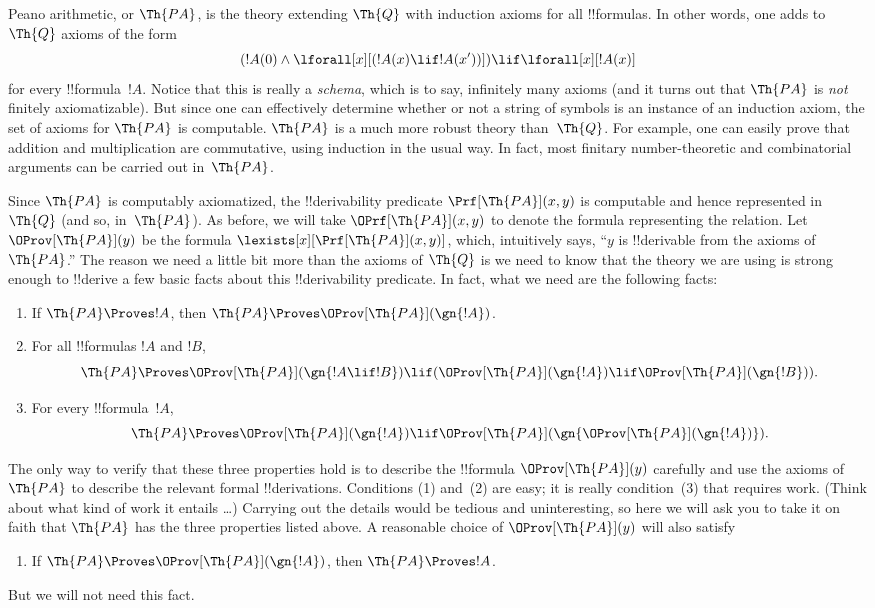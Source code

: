 \documentclass[../../../include/open-logic-section]{subfiles}
\begin{document}


Peano arithmetic, or $\Th{PA}$, is the theory extending $\Th{Q}$ with
induction axioms for all !!{formula}s. In other words, one adds to $\Th{Q}$
axioms of the form
\[
(!A(0) \land \lforall[x][(!A(x) \lif !A(x'))]) \lif \lforall[x][!A(x)]
\]
for every !!{formula}~$!A$. Notice that this is really a
\emph{schema}, which is to say, infinitely many axioms (and it turns
out that $\Th{PA}$ is {\em not} finitely axiomatizable). But since one
can effectively determine whether or not a string of symbols is an
instance of an induction axiom, the set of axioms for $\Th{PA}$ is
computable. $\Th{PA}$ is a much more robust theory than~$\Th{Q}$. For
example, one can easily prove that addition and multiplication are
commutative, using induction in the usual way. In fact, most finitary
number-theoretic and combinatorial arguments can be carried out
in~$\Th{PA}$.

Since $\Th{PA}$ is computably axiomatized, the !!{derivability}
predicate $\Prf[\Th{PA}](x,y)$ is computable and hence represented
in~$\Th{Q}$ (and so, in~$\Th{PA}$). As before, we will take
$\OPrf[\Th{PA}](x,y)$ to denote the formula representing the relation.
Let $\OProv[\Th{PA}](y)$ be the formula
$\lexists[x][\Prf[\Th{PA}](x,y)]$, which, intuitively says, ``$y$ is
!!{derivable} from the axioms of $\Th{PA}$.''  The reason we need a
little bit more than the axioms of $\Th{Q}$ is we need to know that
the theory we are using is strong enough to !!{derive} a few basic
facts about this !!{derivability} predicate. In fact, what we need are
the following facts:
\begin{enumerate}
\item[P1.] If $\Th{PA} \Proves !A$, then $\Th{PA} \Proves
  \OProv[\Th{PA}](\gn{!A})$.
\item[P2.] For all !!{formula}s $!A$ and $!B$,
  \[
  \Th{PA} \Proves \OProv[\Th{PA}](\gn{!A \lif !B}) \lif
  (\OProv[\Th{PA}](\gn{!A}) \lif \OProv[\Th{PA}](\gn{!B})).
  \]
\item[P3.] For every !!{formula}~$!A$,
  \[
  \Th{PA} \Proves \OProv[\Th{PA}](\gn{!A})
  \lif \OProv[\Th{PA}](\gn{\OProv[\Th{PA}](\gn{!A})}).
  \]
\end{enumerate}
The only way to verify that these three properties hold is to describe
the !!{formula} $\OProv[\Th{PA}](y)$ carefully and use the axioms of
$\Th{PA}$ to describe the relevant formal !!{derivation}s. Conditions (1)
and~(2) are easy; it is really condition~(3) that requires
work. (Think about what kind of work it entails \dots) Carrying out the
details would be tedious and uninteresting, so here we will ask you to
take it on faith that $\Th{PA}$ has the three properties listed
above. A reasonable choice of $\OProv[\Th{PA}](y)$ will also satisfy
\begin{enumerate}
\item[P4.] If $\Th{PA} \Proves \OProv[\Th{PA}](\gn{!A})$, then
  $\Th{PA} \Proves !A$.
\end{enumerate}
But we will not need this fact.
\end{document}
